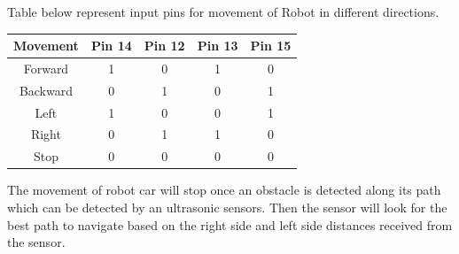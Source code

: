 \documentclass[sigconf]{acmart}
\begin{document}
Table below represent input pins for movement of Robot in different directions.

\begin{center}
\begin{tabular}{ | c | c| c | c| c | } 
\hline
Movement & Pin 14 & Pin 12 & Pin 13 & Pin 15 \\ 
\hline
Forward & 1 & 0 & 1 & 0 \\ 
\hline
Backward & 0 & 1 & 0 & 1 \\
\hline
Left & 1 & 0 & 0 & 1 \\
\hline
Right & 0 & 1 & 1 & 0 \\
\hline
Stop  & 0 & 0 & 0 & 0 \\
\hline

\end{tabular}
\end{center}

The movement of robot car will stop once an obstacle is detected along its path which can be detected by an ultrasonic sensors. Then the sensor will look for the best path to navigate based on the right side and left side distances received from the sensor.
\end{document}
